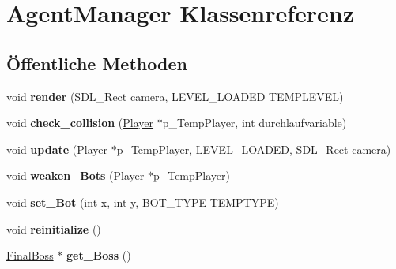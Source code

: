 \hypertarget{class_agent_manager}{\section{Agent\-Manager Klassenreferenz}
\label{class_agent_manager}
}
\subsection*{Öffentliche Methoden}
\begin{DoxyCompactItemize}
\item 
\hypertarget{class_agent_manager_a1b94eb002a1a9a57106539b84402f32a}{void {\bfseries render} (S\-D\-L\-\_\-\-Rect camera, L\-E\-V\-E\-L\-\_\-\-L\-O\-A\-D\-E\-D T\-E\-M\-P\-L\-E\-V\-E\-L)}\label{class_agent_manager_a1b94eb002a1a9a57106539b84402f32a}

\item 
\hypertarget{class_agent_manager_a5548da9e3f247e8dd4a9eb98748fd3df}{void {\bfseries check\-\_\-collision} (\hyperlink{class_player}{Player} $\ast$p\-\_\-\-Temp\-Player, int durchlaufvariable)}\label{class_agent_manager_a5548da9e3f247e8dd4a9eb98748fd3df}

\item 
\hypertarget{class_agent_manager_a1c05e1578aafde1892a5e4e79862b19f}{void {\bfseries update} (\hyperlink{class_player}{Player} $\ast$p\-\_\-\-Temp\-Player, L\-E\-V\-E\-L\-\_\-\-L\-O\-A\-D\-E\-D, S\-D\-L\-\_\-\-Rect camera)}\label{class_agent_manager_a1c05e1578aafde1892a5e4e79862b19f}

\item 
\hypertarget{class_agent_manager_aafa2ae19bfa65b44dc3c955bd21e0fc3}{void {\bfseries weaken\-\_\-\-Bots} (\hyperlink{class_player}{Player} $\ast$p\-\_\-\-Temp\-Player)}\label{class_agent_manager_aafa2ae19bfa65b44dc3c955bd21e0fc3}

\item 
\hypertarget{class_agent_manager_ab00a9cbf5753546fbb5f9f5cfa1b1241}{void {\bfseries set\-\_\-\-Bot} (int x, int y, B\-O\-T\-\_\-\-T\-Y\-P\-E T\-E\-M\-P\-T\-Y\-P\-E)}\label{class_agent_manager_ab00a9cbf5753546fbb5f9f5cfa1b1241}

\item 
\hypertarget{class_agent_manager_abc1499700649f6af77205fedc0698085}{void {\bfseries reinitialize} ()}\label{class_agent_manager_abc1499700649f6af77205fedc0698085}

\item 
\hypertarget{class_agent_manager_a13afeaa1a5581415e3b312444bb43b82}{\hyperlink{class_final_boss}{Final\-Boss} $\ast$ {\bfseries get\-\_\-\-Boss} ()}\label{class_agent_manager_a13afeaa1a5581415e3b312444bb43b82}

\end{DoxyCompactItemize}
